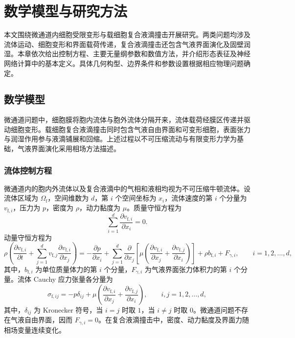 \chapter{数学模型与研究方法}
\label{cha:chap02}

本文围绕微通道内细胞受限变形与载细胞复合液滴撞击开展研究。两类问题均涉及流体运动、细胞变形和界面载荷传递，复合液滴撞击还包含气液界面演化及固壁润湿。本章依次给出控制方程、主要无量纲参数和数值方法，并介绍形态表征及神经网络计算中的基本定义。具体几何构型、边界条件和参数设置根据相应物理问题确定。

\section{数学模型}
\label{sec:ch2_mathematical_model}

微通道问题中，细胞膜将胞内流体与胞外流体分隔开来，流体载荷经膜区传递并驱动细胞变形。载细胞复合液滴撞击同时包含气液自由界面和可变形细胞，表面张力与润湿作用参与液滴铺展和回缩。上述过程以不可压缩流动与有限变形力学为基础，气液界面演化采用相场方法描述。

\subsection{流体控制方程}
\label{subsec:ch2_fluid}

微通道内的胞内外流体以及复合液滴中的气相和液相均视为不可压缩牛顿流体。设流体区域为 $\Omega_{\mathrm f}$，空间维数为 $d$，第 $i$ 个空间坐标为 $x_i$，流体速度的第 $i$ 个分量为 $v_{\mathrm f,i}$，压力为 $p$，密度为 $\rho$，动力黏度为 $\mu$。质量守恒方程为
\begin{equation}
\sum_{i=1}^{d}
\frac{\partial v_{\mathrm f,i}}{\partial x_i}
=0.
\label{eq:ch2_continuity}
\end{equation}
动量守恒方程为
\begin{equation}
\rho
\left(
\frac{\partial v_{\mathrm f,i}}{\partial t}
+
\sum_{j=1}^{d}
v_{\mathrm f,j}
\frac{\partial v_{\mathrm f,i}}{\partial x_j}
\right)
=
-\frac{\partial p}{\partial x_i}
+
\sum_{j=1}^{d}
\frac{\partial}{\partial x_j}
\left[
\mu
\left(
\frac{\partial v_{\mathrm f,i}}{\partial x_j}
+
\frac{\partial v_{\mathrm f,j}}{\partial x_i}
\right)
\right]
+
\rho b_{\mathrm f,i}
+
F_{\gamma,i},
\qquad i=1,2,\ldots,d,
\label{eq:ch2_fluid_momentum}
\end{equation}
其中，$b_{\mathrm f,i}$ 为单位质量体力的第 $i$ 个分量，$F_{\gamma,i}$ 为气液界面张力体积力的第 $i$ 个分量。流体 Cauchy 应力张量各分量为
\begin{equation}
\sigma_{\mathrm f,ij}
=
-p\delta_{ij}
+
\mu
\left(
\frac{\partial v_{\mathrm f,i}}{\partial x_j}
+
\frac{\partial v_{\mathrm f,j}}{\partial x_i}
\right),
\qquad i,j=1,2,\ldots,d,
\label{eq:ch2_fluid_stress}
\end{equation}
其中，$\delta_{ij}$ 为 Kronecker 符号，当 $i=j$ 时取 $1$，当 $i\ne j$ 时取 $0$。微通道问题不存在气液自由界面，因而 $F_{\gamma,i}=0$。在复合液滴撞击中，密度、动力黏度及界面力随相场变量连续变化。

